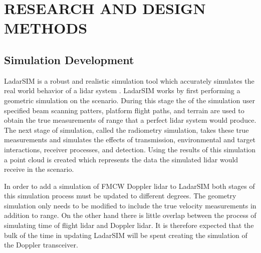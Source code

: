 %
%
%
%

\chapter{RESEARCH AND DESIGN METHODS}

\section{Simulation Development}
LadarSIM is a robust and realistic simulation tool which accurately simulates
the real world behavior of a lidar system \cite{budgeLeishman,neilsenBudge}.
LadarSIM works by first performing a geometric simulation on the scenario. 
During this stage the of the simulation user specified beam scanning patters,
platform flight paths, and terrain are used to obtain the true measurements
of range that a perfect lidar system would produce.
The next stage of simulation, called the radiometry simulation, takes these
true measurements and simulates the effects of transmission, environmental and 
target interactions, receiver processes, and detection. Using the results of 
this simulation a point cloud is created which represents the data the simulated
lidar would receive in the scenario. 

In order to add a simulation of FMCW Doppler lidar to LadarSIM both
stages of this simulation process must be updated to different degrees. The 
geometry simulation only needs to be modified to include the true velocity
measurements in addition to range. On the other hand there is little overlap 
between the process of simulating time of flight lidar and Doppler lidar. It is
therefore expected that the bulk of the time in updating LadarSIM will be spent
creating the simulation of the Doppler transceiver. 
